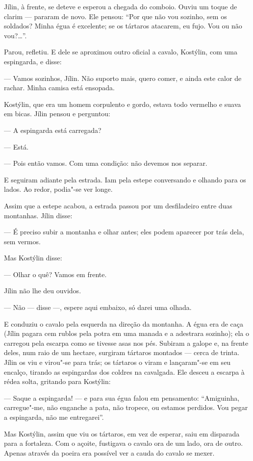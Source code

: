 Jílin, à frente, se deteve e esperou a chegada do comboio. Ouviu um
toque de clarim --- pararam de novo. Ele pensou: ``Por que não vou
sozinho, sem os soldados? Minha égua é excelente; se os tártaros
atacarem, eu fujo. Vou ou não vou?\ldots{}''.

Parou, refletiu. E dele se aproximou outro oficial a cavalo, Kostýlin,
com uma espingarda, e disse:

--- Vamos sozinhos, Jílin. Não suporto mais, quero comer, e ainda este
calor de rachar. Minha camisa está ensopada.

Kostýlin, que era um homem corpulento e gordo, estava todo vermelho e
suava em bicas. Jílin pensou e perguntou:

--- A espingarda está carregada?

--- Está.

--- Pois então vamos. Com uma condição: não devemos nos separar.

E seguiram adiante pela estrada. Iam pela estepe conversando e olhando
para os lados. Ao redor, podia"-se ver longe.

Assim que a estepe acabou, a estrada passou por um desfiladeiro entre
duas montanhas. Jílin disse:

--- É preciso subir a montanha e olhar antes; eles podem aparecer por
trás dela, sem vermos.

Mas Kostýlin disse:

--- Olhar o quê? Vamos em frente.

Jílin não lhe deu ouvidos.

--- Não --- disse ---, espere aqui embaixo, só darei uma olhada.

E conduziu o cavalo pela esquerda na direção da montanha. A égua era de
caça (Jílin pagara cem rublos pela potra em uma manada e a adestrara
sozinho); ela o carregou pela escarpa como se tivesse asas nos pés.
Subiram a galope e, na frente deles, num raio de um hectare, surgiram
tártaros montados --- cerca de trinta. Jílin os viu e virou"-se para
trás; os tártaros o viram e lançaram"-se em seu encalço, tirando as
espingardas dos coldres na cavalgada. Ele desceu a escarpa à rédea
solta, gritando para Kostýlin:

--- Saque a espingarda! --- e para sua égua falou em pensamento:
``Amiguinha, carregue"-me, não enganche a pata, não tropece, ou estamos
perdidos. Vou pegar a espingarda, não me entregarei''.

Mas Kostýlin, assim que viu os tártaros, em vez de esperar, saiu em
disparada para a fortaleza. Com o açoite, fustigava o cavalo ora de um
lado, ora de outro. Apenas através da poeira era possível ver a cauda do
cavalo se mexer.

